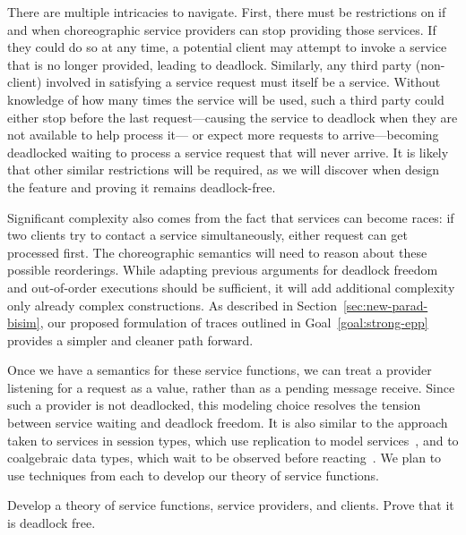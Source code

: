 There are multiple intricacies to navigate.
First, there must be restrictions on if and when choreographic service providers can stop providing those services.
If they could do so at any time, a potential client may attempt to invoke a service that is no longer provided, leading to deadlock.
Similarly, any third party (non-client) involved in satisfying a service request must itself be a service.
Without knowledge of how many times the service will be used,
such a third party could either stop before the last request---causing the service to deadlock when they are not available to help process it---%
or expect more requests to arrive---becoming deadlocked waiting to process a service request that will never arrive.
It is likely that other similar restrictions will be required, as we will discover when design the feature and proving it remains deadlock-free.

Significant complexity also comes from the fact that services can become races:
if two clients try to contact a service simultaneously, either request can get processed first.
The choreographic semantics will need to reason about these possible reorderings.
While adapting previous arguments for deadlock freedom and out-of-order executions should be sufficient,
it will add additional complexity only already complex constructions.
As described in Section~\ref{sec:new-parad-bisim}, our proposed formulation of traces outlined in Goal~\ref{goal:strong-epp}
provides a simpler and cleaner path forward.

Once we have a semantics for these service functions, we can treat a provider listening for a request as a value, rather than as a pending message receive.
Since such a provider is not deadlocked, this modeling choice resolves the tension between service waiting and deadlock freedom.
It is also similar to the approach taken to services in session types, which use replication to model services~\cite{DeYoungCPT09,CairesP10,Wadler12,LeBrunFD25},
and to coalgebraic data types, which wait to be observed before reacting~\cite{KozenS17}.
We plan to use techniques from each to develop our theory of service functions.

\begin{goal}
  \label{goal:wait-until-called}
  Develop a theory of service functions, service providers, and clients.
  Prove that it is deadlock free.
\end{goal}


\iffalse
{}

